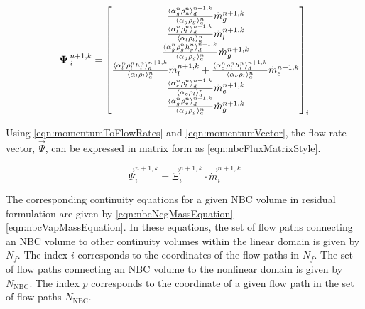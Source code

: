 \begin{equation}
\label{eqn:nbcFluxDefinition}
\vec{\Psi}^{n+1, k}_{i} = \begin{bmatrix}
\frac{\don{\alpha^{n}_{g} \rho^{n}_{n}}^{n+1,k}_{d}}{\ave{\alpha_{g} \rho_{g}}^{n}_{a}}\dot{m}^{n+1,k}_{g} \\
%
\frac{\don{\alpha^{n}_{l}\rho^{n}_{l}}^{n+1,k}_{d}}{\ave{\alpha_{l} \rho_{l}}^{n}_{a}}\dot{m}^{n+1,k}_{l}\\
%
\frac{\don{\alpha^{n}_{g} \rho^{n}_{g} h^{n}_{g}}^{n+1,k}_{d}}{\ave{\alpha_{g} \rho_{g}}^{n}_{a}}\dot{m}^{n+1, k}_{g}\\
%
\frac{\don{\alpha^{n}_{l}\rho^{n}_{l} h^{n}_{l}}^{n+1,k}_{d}}{\ave{\alpha_{l} \rho_{l}}^{n}_{a}}\dot{m}^{n+1, k}_{l} +\frac{\don{\alpha^{n}_{e} \rho^{n}_{l} h^{n}_{l}}^{n+1, k}_{d}}{\ave{\alpha_{e} \rho_{l}}^{n}_{a}}\dot{m}^{n+1, k}_{e} \\
%
\frac{ \don{\alpha^{n}_{e} \rho^{n}_{l}}^{n+1, k}_{d}}{ \ave{\alpha_{e} \rho_{l}}^{n}_{a}} \dot{m}^{n+1, k}_{e} \\
%
\frac{ \don{\alpha^{n}_{g} \rho^{n}_{v}}^{n+1, k}_{d}}{ \ave{\alpha_{g} \rho_{g}}^{n}_{a}} \dot{m}^{n+1, k}_{g}
\end{bmatrix}_{i}
\end{equation}

Using \eqref{eqn:momentumToFlowRates} and \eqref{eqn:momentumVector}, the flow rate vector, $\vec{\Psi}$, can be expressed in matrix form as \eqref{eqn:nbcFluxMatrixStyle}.

\begin{equation}
\label{eqn:nbcFluxMatrixStyle}
\vec{\Psi}^{n+1, k}_{i} = \vec{\Xi}^{n+1, k}_{i} \cdot \vec{\dot{m}}^{n+1, k}_{i}
\end{equation}

The corresponding continuity equations for a given NBC volume in residual formulation are given by \eqref{eqn:nbcNcgMassEquation} -- \eqref{eqn:nbcVapMassEquation}.
In these equations, the set of flow paths connecting an NBC volume to other continuity volumes within the linear domain is given by $N_{f}$.
The index $i$ corresponds to the coordinates of the flow paths in $N_{f}$.
The set of flow paths connecting an NBC volume to the nonlinear domain is given by $N_{\text{NBC}}$.
The index $p$ corresponds to the coordinate of a given flow path in the set of flow paths $N_{\text{NBC}}$.

